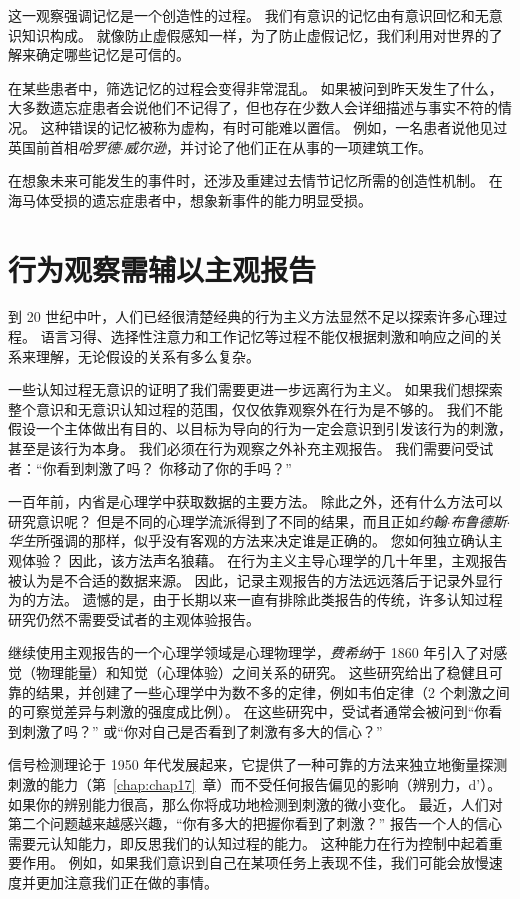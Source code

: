这一观察强调记忆是一个创造性的过程。
我们有意识的记忆由有意识回忆和无意识知识构成。
就像防止虚假感知一样，为了防止虚假记忆，我们利用对世界的了解来确定哪些记忆是可信的。


在某些患者中，筛选记忆的过程会变得非常混乱。
如果被问到昨天发生了什么，大多数遗忘症患者会说他们不记得了，但也存在少数人会详细描述与事实不符的情况。
这种错误的记忆被称为虚构，有时可能难以置信。
例如，一名患者说他见过英国前首相\textit{哈罗德$\cdot$威尔逊}，并讨论了他们正在从事的一项建筑工作。


在想象未来可能发生的事件时，还涉及重建过去情节记忆所需的创造性机制。
在海马体受损的遗忘症患者中，想象新事件的能力明显受损。



\section{行为观察需辅以主观报告}

到 20 世纪中叶，人们已经很清楚经典的行为主义方法显然不足以探索许多心理过程。
语言习得、选择性注意力和工作记忆等过程不能仅根据刺激和响应之间的关系来理解，无论假设的关系有多么复杂。


一些认知过程无意识的证明了我们需要更进一步远离行为主义。
如果我们想探索整个意识和无意识认知过程的范围，仅仅依靠观察外在行为是不够的。
我们不能假设一个主体做出有目的、以目标为导向的行为一定会意识到引发该行为的刺激，甚至是该行为本身。
我们必须在行为观察之外补充主观报告。
我们需要问受试者：“你看到刺激了吗？
你移动了你的手吗？”


一百年前，内省是心理学中获取数据的主要方法。
除此之外，还有什么方法可以研究意识呢？
但是不同的心理学流派得到了不同的结果，而且正如\textit{约翰$\cdot$布鲁德斯$\cdot$华生}所强调的那样，似乎没有客观的方法来决定谁是正确的。
您如何独立确认主观体验？
因此，该方法声名狼藉。
在行为主义主导心理学的几十年里，主观报告被认为是不合适的数据来源。
因此，记录主观报告的方法远远落后于记录外显行为的方法。
遗憾的是，由于长期以来一直有排除此类报告的传统，许多认知过程研究仍然不需要受试者的主观体验报告。


继续使用主观报告的一个心理学领域是心理物理学，\textit{费希纳}于 1860 年引入了对感觉（物理能量）和知觉（心理体验）之间关系的研究。
这些研究给出了稳健且可靠的结果，并创建了一些心理学中为数不多的定律，例如韦伯定律（2 个刺激之间的可察觉差异与刺激的强度成比例）。
在这些研究中，受试者通常会被问到“你看到刺激了吗？” 或“你对自己是否看到了刺激有多大的信心？”


信号检测理论于 1950 年代发展起来，它提供了一种可靠的方法来独立地衡量探测刺激的能力（第~\ref{chap:chap17}~章）而不受任何报告偏见的影响（辨别力，d'）。
如果你的辨别能力很高，那么你将成功地检测到刺激的微小变化。
最近，人们对第二个问题越来越感兴趣，“你有多大的把握你看到了刺激？” 
报告一个人的信心需要元认知能力，即反思我们的认知过程的能力。
这种能力在行为控制中起着重要作用。
例如，如果我们意识到自己在某项任务上表现不佳，我们可能会放慢速度并更加注意我们正在做的事情。


